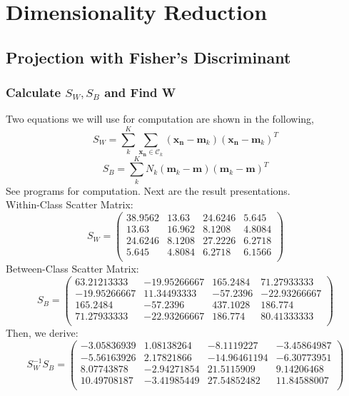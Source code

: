 \documentclass[11pt,a4paper]{article}
\newcommand{\htab}{\hspace*{0.63cm}}
\newcommand{\xnv}{\boldsymbol{x_{n}}}
\newcommand{\C}{\mathcal{C}}
\newcommand{\m}{\textbf{m}}
\begin{document}
\section{Dimensionality Reduction}
\subsection{Projection with Fisher's Discriminant}
\subsubsection{Calculate $S_{W},S_{B}$ and Find \textbf{W}}
\htab Two equations we will use for computation are shown in the following,
    \begin{equation}
        S_{W} = \sum_{k}^{K} \sum_{\xnv \in \C_{k}} (\xnv - \m_{k}) (\xnv - \m_{k})^{T}
    \end{equation}
    \begin{equation}
        S_{B} = \sum_{k}^{K} N_{k} (\m_{k} - \m) (\m_{k} - \m)^{T}
    \end{equation}
\htab See programs for computation. Next are the result presentations. \\
\htab Within-Class Scatter Matrix:\\
$$ S_{W} = \begin{pmatrix}   
    38.9562 &  13.63   &  24.6246  &  5.645  \\
    13.63   &  16.962  &   8.1208  &  4.8084 \\
    24.6246 &  8.1208  & 27.2226   & 6.2718 \\
    5.645   &  4.8084  &  6.2718   &  6.1566 \\ 
 \end{pmatrix} $$
\htab Between-Class Scatter Matrix:\\
$$ S_{B} = \begin{pmatrix}
    63.21213333  & -19.95266667  & 165.2484    &    71.27933333 \\
    -19.95266667  &  11.34493333  & -57.2396    &   -22.93266667 \\
    165.2484     &  -57.2396      & 437.1028    &   186.774      \\
    71.27933333  & -22.93266667 &  186.774     &    80.41333333 \\
    \end{pmatrix} $$
\htab Then, we derive: \\
$$ S_{W}^{-1} S_{B} = \begin{pmatrix}
    -3.05836939  &  1.08138264  & -8.1119227   & -3.45864987\\
    -5.56163926   & 2.17821866  & -14.96461194   & -6.30773951\\
    8.07743878   & -2.94271854  & 21.5115909   &  9.14206468\\
    10.49708187  & -3.41985449   & 27.54852482  & 11.84588007\\
    \end{pmatrix} $$
\end{document}
